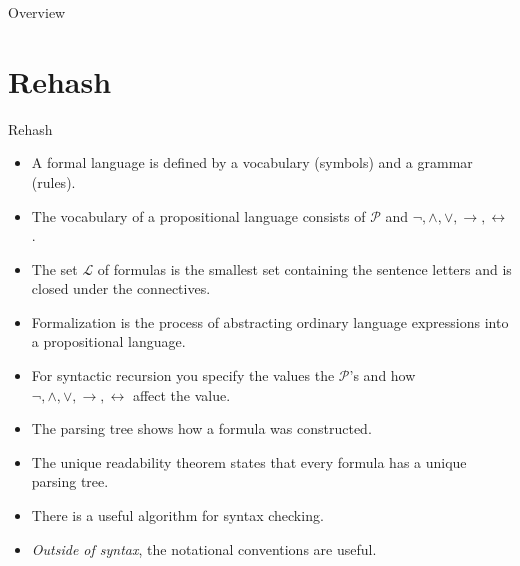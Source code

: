 \setcounter{framenumber}{128}
\begin{frame}
	\maketitle
\end{frame}

\begin{frame}{Overview}
\tableofcontents
\end{frame}

\section{Rehash}
\begin{frame}{Rehash}
	
 \begin{itemize}

	\item A formal language is defined by a vocabulary (symbols) and a grammar (rules).
	
	\item The vocabulary of a propositional language consists of $\mathcal{P}$ and $\neg,\land,\lor,\to,\leftrightarrow$.
	
	\item \alert{The set $\mathcal{L}$ of formulas is the smallest set containing the sentence letters and is closed under the connectives.} 
	
	\item Formalization is the process of abstracting ordinary language expressions into a propositional language.
	
	\item \alert{For syntactic recursion you specify the values the $\mathcal{P}$'s and how $\neg,\land,\lor,\to,\leftrightarrow$ affect the value.}
	
	\item \alert{The parsing tree shows how a formula was constructed.}
	
	\item The unique readability theorem states that every formula has a unique parsing tree.
	
	\item There is a useful algorithm for syntax checking.
	
	\item \alert{\emph{Outside of syntax}, the notational conventions are useful.}

\end{itemize}
	\end{frame}
		

